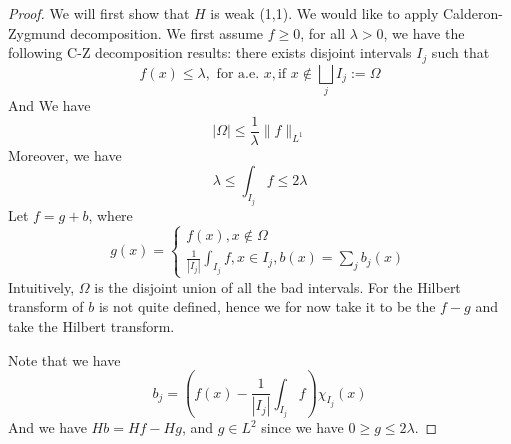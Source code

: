 \begin{proof}
    We will first show that $H$ is weak (1,1). We would like to apply Calderon-Zygmund decomposition. We first assume $f\geq 0$, for all $\lambda>0$, we have the following C-Z decomposition results: there exists disjoint intervals $I_j$ such that
    \begin{equation*}
        f(x)\leq\lambda, \text{ for a.e. } x, \text{if } x\not\in\bigsqcup_j I_j:=\Omega
    \end{equation*}
    And We have 
    \begin{equation*}
        |\Omega|\leq\frac{1}{\lambda}\|f\|_{L^1}
    \end{equation*}
    Moreover, we have
    \begin{equation*}
        \lambda\leq\int_{I_j}f\leq 2\lambda
    \end{equation*}
    Let $f=g+b$, where
    \begin{equation*}
        g(x)=\begin{cases}
            f(x), x\not\in\Omega\\
            \frac{1}{|I_j|}\int_{I_j}f, x\in I_j, b(x)=\sum_jb_j(x)
        \end{cases}
    \end{equation*}
    Intuitively, $\Omega$ is the disjoint union of all the bad intervals. 
    For the Hilbert transform of $b$ is not quite defined, hence we for now take it to be the $f-g$ and take the Hilbert transform.

    Note that we have
    \begin{equation*}
        b_j=(f(x)-\frac{1}{|I_j|}\int_{I_j}f)\chi_{I_j}(x)
    \end{equation*}
    And we have $Hb=Hf-Hg$, and $g\in L^2$ since we have $0\geq g\leq 2\lambda$.


\end{proof}
